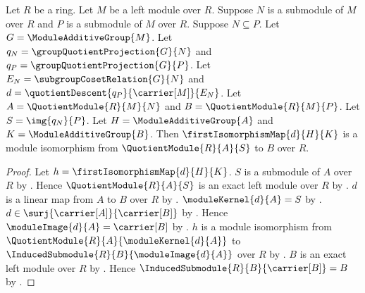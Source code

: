 \begin{theorem}\label{module_third_isomorphism_theorem}
    Let $R$ be a ring.
    Let $M$ be a left module over $R$.
    Suppose $N$ is a submodule of $M$ over $R$ and
        $P$ is a submodule of $M$ over $R$.
    Suppose $N\subseteq P$.
    Let $G=\ModuleAdditiveGroup{M}$.
    Let $q_N=\groupQuotientProjection{G}{N}$ and
        $q_P=\groupQuotientProjection{G}{P}$.
    Let $E_N=\subgroupCosetRelation{G}{N}$ and
        $d=\quotientDescent{q_P}{\carrier[M]}{E_N}$.
    Let $A=\QuotientModule{R}{M}{N}$ and
        $B=\QuotientModule{R}{M}{P}$.
    Let $S=\img{q_N}{P}$.
    Let $H=\ModuleAdditiveGroup{A}$ and
        $K=\ModuleAdditiveGroup{B}$.
    Then $\firstIsomorphismMap{d}{H}{K}$ is a module isomorphism from
        $\QuotientModule{R}{A}{S}$ to $B$ over $R$.
\end{theorem}
\begin{proof}
    Let $h=\firstIsomorphismMap{d}{H}{K}$.
    $S$ is a submodule of $A$ over $R$ by
        .
    Hence $\QuotientModule{R}{A}{S}$ is an exact left module over $R$
        by .
    $d$ is a linear map from $A$ to $B$ over $R$ by
        .
    $\moduleKernel{d}{A}=S$ by
        .
    $d\in\surj{\carrier[A]}{\carrier[B]}$ by
        .
    Hence $\moduleImage{d}{A}=\carrier[B]$ by
        .
    $h$ is a module isomorphism from
        $\QuotientModule{R}{A}{\moduleKernel{d}{A}}$ to
        $\InducedSubmodule{R}{B}{\moduleImage{d}{A}}$
        over $R$ by .
    $B$ is an exact left module over $R$ by
        .
    Hence $\InducedSubmodule{R}{B}{\carrier[B]}=B$ by
        .
\end{proof}

